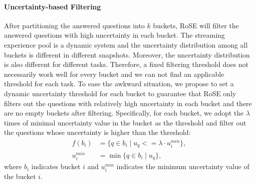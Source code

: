 \documentclass[11pt]{article}
\begin{document}
\paragraph{Uncertainty-based Filtering} After partitioning the answered questions into $k$ buckets, RoSE will filter the answered questions with high uncertainty in each bucket. The streaming experience pool is a dynamic system and the uncertainty distribution among all buckets is different in different snapshots. Moreover, the uncertainty distribution is also different for different tasks. Therefore, a fixed filtering threshold does not necessarily work well for every bucket and we can not find an applicable threshold for each task. To ease the awkward situation, we propose to set a dynamic uncertainty threshold for each bucket to guarantee that RoSE only filters out the questions with relatively high uncertainty in each bucket and there are no empty buckets after filtering. Specifically, for each bucket, we adopt the $\lambda$ times of minimal uncertainty value in the bucket as the threshold and filter out the questions whose uncertainty is higher than the threshold:
\begin{align}
f(b_i) &= \{ q \in b_i \mid u_{q} <= \lambda \cdot u_i^{min} \}, \\
u_i^{min} &= \min\{q \in b_i \mid u_{q} \},
\end{align}
where $b_i$ indicates bucket $i$ and $u_i^{min}$ indicates the minimum uncertainty value of the bucket $i$.

\end{document}
